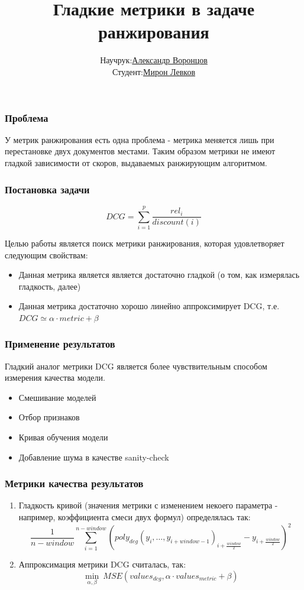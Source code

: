 \documentclass[10pt]{beamer}
\newcommand{\Sum}{\sum\limits}
\begin{document}
\title{Гладкие метрики в задаче ранжирования}
\author[]
{
\begin{tabular}{rl}
Научрук: & \href{https://staff.yandex-team.ru/graf-vk}{Александр Воронцов} \\
Студент: & \href{https://staff.yandex-team.ru/mlevkov}{Мирон Левков}
\end{tabular}
}

\frame{\titlepage}
\date{}

\begin{frame}
\frametitle{Проблема}

У метрик ранжирования есть одна проблема - метрика меняется лишь при перестановке двух документов местами. 
Таким образом метрики не имеют гладкой зависимости от скоров, выдаваемых ранжирующим алгоритмом.
\end{frame}


\begin{frame}
\frametitle{Постановка задачи}

$$\boxed {DCG = \Sum_{i=1}^p \frac{rel_i}{discount(i)}}$$

Целью работы является поиск метрики ранжирования, которая удовлетворяет следующим свойствам:
\begin{itemize}
\item Данная метрика является является достаточно гладкой (о том, как измерялась гладкость, далее)
\item Данная метрика достаточно хорошо линейно аппроксимирует DCG, т.е. $DCG \simeq \alpha \cdot metric + \beta$
\end{itemize}
\end{frame}


\begin{frame}
\frametitle{Применение результатов}
Гладкий аналог метрики DCG является более чувствительным способом измерения качества модели.
\begin{itemize}
\item Смешивание моделей
\item Отбор признаков
\item Кривая обучения модели
\item Добавление шума в качестве sanity-check
\end{itemize}
\end{frame}


\begin{frame}
\frametitle{Метрики качества результатов}
\begin{enumerate}
\item Гладкость кривой (значения метрики с изменением некоего параметра - например, коэффициента смеси двух формул)
определялась так:
$$\frac{1}{n - window} \Sum_{i=1}^{n - window} (poly_{deg}(y_i,\dots,y_{i + window - 1})_{i + \frac{window}{2}} - y_{i + \frac{window}{2}})^2$$
\item Аппроксимация метрики DCG считалась, так:\\
$$\underset{\alpha, \beta}{\min} ~ MSE(values_{dcg}, \alpha \cdot values_{metric} + \beta)$$
\end{enumerate}
\end{frame}
\end{document}
